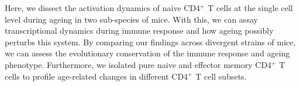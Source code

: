 Here, we dissect the activation dynamics of naive CD4$^+$ T cells at the single cell level during ageing in two sub-species of mice. With this, we can assay transcriptional dynamics during immune response and how ageing possibly perturbs this system. By comparing our findings across divergent strains of mice, we can assess the evolutionary conservation of the immune response and ageing phenotype. Furthermore, we isolated pure naive and effector memory CD4$^+$ T cells to profile age-related changes in different CD4$^+$ T cell subsets.
